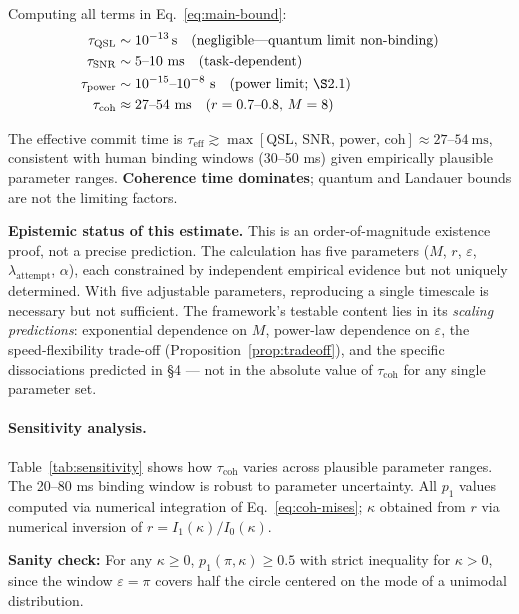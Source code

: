 \documentclass[12pt]{article}
\begin{document}
Computing all terms in Eq.~\ref{eq:main-bound}:
\begin{align}
\tau_{\mathrm{QSL}} &\sim 10^{-13} \,\mathrm{s} \quad \text{(negligible---quantum limit non-binding)} \\
\tau_{\mathrm{SNR}} &\sim 5\text{--}10~\mathrm{ms} \quad \text{(task-dependent)} \\
\tau_{\mathrm{power}} &\sim 10^{-15}\text{--}10^{-8}~\mathrm{s} \quad \text{(power limit; \S2.1)} \\
\tau_{\mathrm{coh}} &\approx 27\text{--}54~\mathrm{ms} \quad \text{($r = 0.7$--$0.8$, $M = 8$)}
\end{align}

The effective commit time is $\tau_{\mathrm{eff}} \gtrsim \max[\text{QSL, SNR, power, coh}] \approx 27$--$54~\mathrm{ms}$, consistent with human binding windows (30--50 ms) given empirically plausible parameter ranges. \textbf{Coherence time dominates}; quantum and Landauer bounds are not the limiting factors.

\textbf{Epistemic status of this estimate.} This is an order-of-magnitude existence proof, not a precise prediction. The calculation has five parameters ($M$, $r$, $\varepsilon$, $\lambda_{\mathrm{attempt}}$, $\alpha$), each constrained by independent empirical evidence but not uniquely determined. With five adjustable parameters, reproducing a single timescale is necessary but not sufficient. The framework's testable content lies in its \emph{scaling predictions}: exponential dependence on $M$, power-law dependence on $\varepsilon$, the speed-flexibility trade-off (Proposition~\ref{prop:tradeoff}), and the specific dissociations predicted in \S4 --- not in the absolute value of $\tau_{\mathrm{coh}}$ for any single parameter set.

\paragraph{Sensitivity analysis.} Table~\ref{tab:sensitivity} shows how $\tau_{\mathrm{coh}}$ varies across plausible parameter ranges. The 20--80 ms binding window is robust to parameter uncertainty. All $p_1$ values computed via numerical integration of Eq.~\ref{eq:coh-mises}; $\kappa$ obtained from $r$ via numerical inversion of $r = I_1(\kappa)/I_0(\kappa)$.

\textbf{Sanity check:} For any $\kappa \geq 0$, $p_1(\pi, \kappa) \geq 0.5$ with strict inequality for $\kappa > 0$, since the window $\varepsilon = \pi$ covers half the circle centered on the mode of a unimodal distribution.
\end{document}
